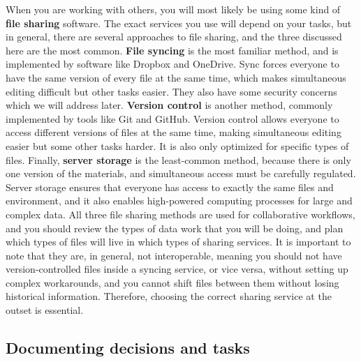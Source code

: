 When you are working with others, you will most likely be using
some kind of \textbf{file sharing} software.
The exact services you use will depend on your tasks,
but in general, there are several approaches to file sharing,
and the three discussed here are the most common.
\textbf{File syncing} is the most familiar method,
and is implemented by software like Dropbox and OneDrive.
Sync forces everyone to have the same version of every file at the same time,
which makes simultaneous editing difficult but other tasks easier.
They also have some security concerns which we will address later.
\textbf{Version control} is another method,
commonly implemented by tools like Git and GitHub.
Version control allows everyone to access different versions of files at the same time,
making simultaneous editing easier but some other tasks harder.
It is also only optimized for specific types of files.
Finally, \textbf{server storage} is the least-common method,
because there is only one version of the materials,
and simultaneous access must be carefully regulated.
Server storage ensures that everyone has access
to exactly the same files and environment, and it also enables
high-powered computing processes for large and complex data.
All three file sharing methods are used for collaborative workflows,
and you should review the types of data work
that you will be doing, and plan which types of files
will live in which types of sharing services.
It is important to note that they are, in general, not interoperable,
meaning you should not have version-controlled files inside a syncing service,
or vice versa, without setting up complex workarounds,
and you cannot shift files between them without losing historical information.
Therefore, choosing the correct sharing service at the outset is essential.

\subsection{Documenting decisions and tasks}

